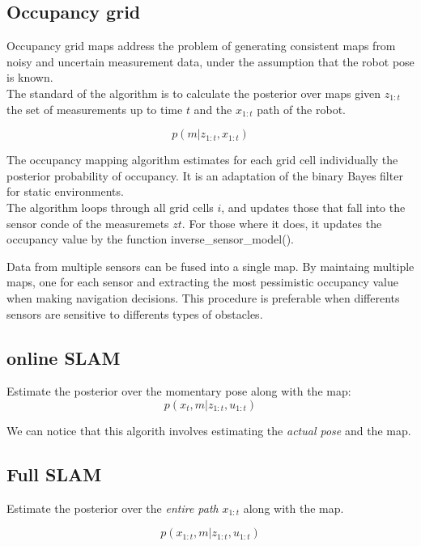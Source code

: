 \documentclass[10pt,journal,compsoc]{IEEEtran}
\begin{document}
\subsection{Occupancy grid}

Occupancy grid maps address the problem of generating consistent maps from noisy and uncertain measurement data, under
the assumption that the robot pose is known.\\
The standard of the algorithm is to calculate the posterior over maps given $z_{1:t}$ the set of measurements up to time
$t$ and the $x_{1:t}$ path of the robot.

\begin{equation}
  p(m|z_{1:t},x_{1:t})
\end{equation}

The occupancy mapping algorithm estimates for each grid cell individually the posterior probability of occupancy. It is
an adaptation of the binary Bayes filter for static environments.\\
The algorithm loops through all grid cells $i$, and updates those that
fall into the sensor conde of the measuremets $zt$. For those where it does, it updates the occupancy value by the
function inverse\_sensor\_model().


Data from multiple sensors can be fused into a single map. By maintaing multiple maps, one for each sensor and
extracting the most pessimistic occupancy value when making navigation decisions. This procedure is preferable when
differents sensors are sensitive to differents types of obstacles.

\subsection{online SLAM}

Estimate the posterior over the momentary pose along with the map:
\begin{equation}
  p(x_t, m| z_{1:t},u_{1:t})
\end{equation}

We can notice that this algorith involves estimating the \textit{actual pose} and the map.
\subsection{Full SLAM}
Estimate the posterior over the \textit{entire path} $x_{1:t}$ along with the map.

\begin{equation}
  p(x_{1:t}, m| z_{1:t},u_{1:t})
\end{equation}
\end{document}
